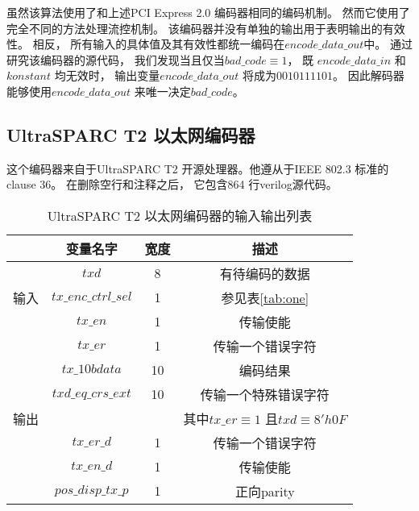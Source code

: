 虽然该算法使用了和上述PCI Express 2.0 编码器相同的编码机制。
然而它使用了完全不同的方法处理流控机制。
该编码器并没有单独的输出用于表明输出的有效性。
相反，
所有输入的具体值及其有效性都统一编码在$encode\_data\_out$中。
通过研究该编码器的源代码，
我们发现当且仅当$bad\_code\equiv 1$，
既
$encode\_data\_in$ 和$konstant$ 均无效时，
输出变量$encode\_data\_out$ 将成为$0010111101$。
因此解码器能够使用$encode\_data\_out$ 来唯一决定$bad\_code$。



\subsection{UltraSPARC T2 以太网编码器}\label{subsec_t2e}
这个编码器来自于UltraSPARC T2 开源处理器。他遵从于IEEE 802.3 标准的clause 36。
在删除空行和注释之后，
它包含864 行verilog源代码。


\begin{table}[b]%
\caption{UltraSPARC T2 以太网编码器的输入输出列表}
\label{tab:t2eth}
\begin{tabular}{|c|c|c|c|}
\hline
         & 变量名字             & 宽度  & 描述\\\hline\hline
         & $txd$                & 8     &有待编码的数据\\\cline{2-4}
输入     & $tx\_enc\_ctrl\_sel$ & 1     &参见表\ref{tab:one} \\\cline{2-4}
         & $tx\_en$             & 1     &传输使能\\\cline{2-4}
         & $tx\_er$             & 1     &传输一个错误字符\\\hline
         & $tx\_10bdata$        & 10    &编码结果 \\\cline{2-4}
         & $txd\_eq\_crs\_ext$  & 10    &传输一个特殊错误字符\\
输出     &                      &       &其中$tx\_er\equiv 1$ 且$txd\equiv 8'h0F$ \\\cline{2-4}
         & $tx\_er\_d$          & 1     &传输一个错误字符\\\cline{2-4}
         & $tx\_en\_d$          & 1     &传输使能\\\cline{2-4}
         & $pos\_disp\_tx\_p$   & 1     &正向parity\\\hline
\end{tabular}
\end{table}%

